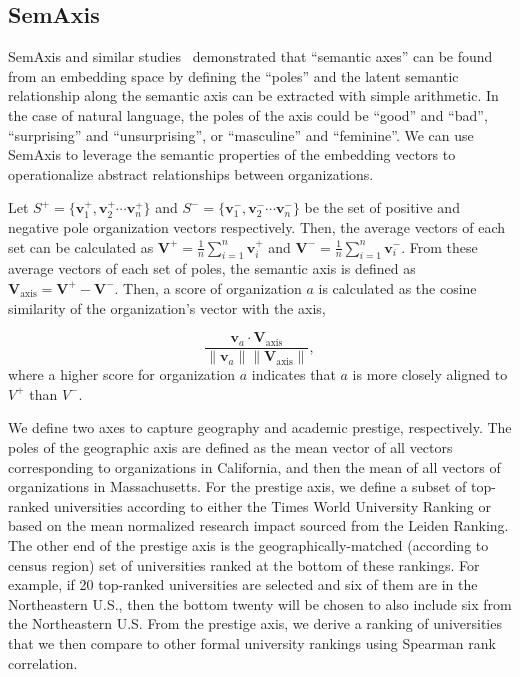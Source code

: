 \documentclass[12pt]{article} %
\begin{document}
%
%
\subsection*{SemAxis}
SemAxis and similar studies~\autocite{an2018semaxis, nakandala2017gendered, kozlowski2018geometry} demonstrated that ``semantic axes'' can be found from an embedding space by defining the ``poles'' and the latent semantic relationship along the semantic axis can be extracted with simple arithmetic.
In the case of natural language, the poles of the axis could be ``good'' and ``bad'', ``surprising'' and ``unsurprising'', or ``masculine'' and ``feminine''.
We can use SemAxis to leverage the semantic properties of the embedding vectors to operationalize abstract relationships between organizations.

Let $S^+ = \{\bm{v}_1^+, \bm{v}_2^+ \cdots \bm{v}_n^+\}$ and $S^- =\{\bm{v}_1^-, \bm{v}_2^- \cdots \bm{v}_n^-\}$ be the set of positive and negative pole organization vectors respectively.
Then, the average vectors of each set can be calculated as $\bm{V}^{+} = \frac{1}{n}\sum^n_{i=1} \bm{v}_i^+$ and $\bm{V}^{-} = \frac{1}{n}\sum^n_{i=1} \bm{v}_i^-$.
From these average vectors of each set of poles, the semantic axis is defined as $\bm{V}_{\text{axis}} = \bm{V}^{+} - \bm{V}^{-}$. Then,  a score of organization $a$ is calculated as the cosine similarity of the organization's vector with the axis,



\begin{equation}
	\frac{\bm{v}_{a} \cdot \bm{V}_{\text{axis}}}{\lVert \bm{v}_{a} \rVert \lVert \bm{V}_{\text{axis}} \rVert},
\end{equation}
where a higher score for organization $a$ indicates that $a$ is more closely aligned to $V^+$ than $V^-$.

We define two axes to capture geography and academic prestige, respectively.
The poles of the geographic axis are defined as the mean vector of all vectors corresponding to organizations in California, and then the mean of all vectors of organizations in Massachusetts.
For the prestige axis, we define a subset of top-ranked universities according to either the Times World University Ranking or based on the mean normalized research impact sourced from the Leiden Ranking.
The other end of the prestige axis is the geographically-matched (according to census region) set of universities ranked at the bottom of these rankings.
For example, if 20 top-ranked universities are selected and six of them are in the Northeastern U.S., then the bottom twenty will be chosen to also include six from the Northeastern U.S.
From the prestige axis, we derive a ranking of universities that we then compare to other formal university rankings using Spearman rank correlation.
\end{document}
